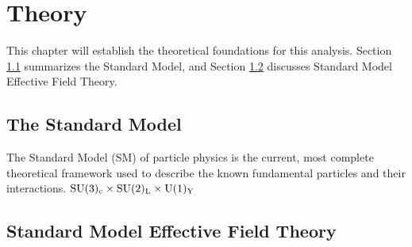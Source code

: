 \chapter{Theory}\label{ch:theory}

This chapter will establish the theoretical foundations for this analysis. Section \ref{sec:theory-sm} summarizes the Standard Model, and Section \ref{sec:theory-smeft} discusses Standard Model Effective Field Theory. 

\section{The Standard Model}\label{sec:theory-sm}

The Standard Model (SM) of particle physics is the current, most complete theoretical framework used to describe the known fundamental particles and their interactions. 
$\rm{SU}(3)_c\times\rm{SU}(2)_L\times\rm{U}(1)_Y$


\section{Standard Model Effective Field Theory}\label{sec:theory-smeft}